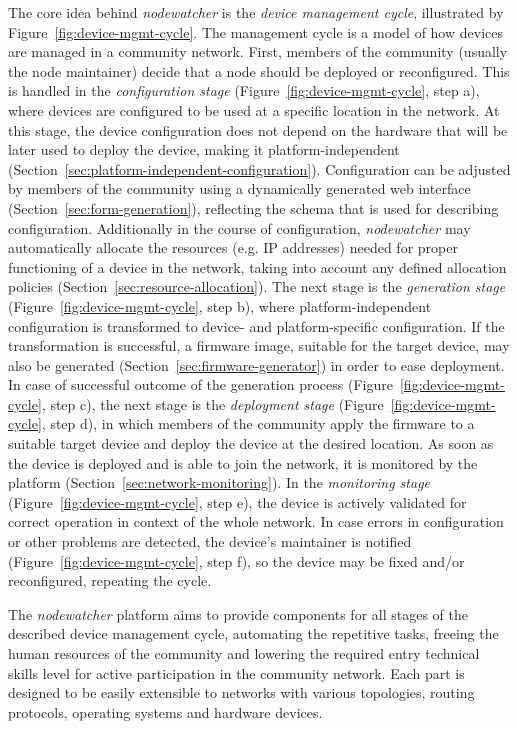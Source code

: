 \documentclass[5p,sort&compress]{elsarticle}
\newcommand{\nodewatcher}{\textit{nodewatcher}}
\begin{document}
The core idea behind \nodewatcher{} is the \textit{device management cycle}, illustrated by Figure~\ref{fig:device-mgmt-cycle}.
The management cycle is a model of how devices are managed in a community network.
First, members of the community (usually the node maintainer) decide that a node should be deployed or reconfigured.
This is handled in the \textit{configuration stage} (Figure~\ref{fig:device-mgmt-cycle}, step a), where devices are configured to be used at a specific location in the network.
At this stage, the device configuration does not depend on the hardware that will be later used to deploy the device, making it platform-independent (Section~\ref{sec:platform-independent-configuration}).
Configuration can be adjusted by members of the community using a dynamically generated web interface (Section~\ref{sec:form-generation}), reflecting the schema that is used for describing configuration.
Additionally in the course of configuration, \nodewatcher{} may automatically allocate the resources (e.g. IP addresses) needed for proper functioning of a device in the network, taking into account any defined allocation policies (Section~\ref{sec:resource-allocation}).
The next stage is the \textit{generation stage} (Figure~\ref{fig:device-mgmt-cycle}, step b), where platform-independent configuration is transformed to device- and platform-specific configuration. 
If the transformation is successful, a firmware image, suitable for the target device, may also be generated (Section~\ref{sec:firmware-generator}) in order to ease deployment.
In case of successful outcome of the generation process (Figure~\ref{fig:device-mgmt-cycle}, step c), the next stage is the \textit{deployment stage} (Figure~\ref{fig:device-mgmt-cycle}, step d), in which members of the community apply the firmware to a suitable target device and deploy the device at the desired location.
As soon as the device is deployed and is able to join the network, it is monitored by the platform (Section~\ref{sec:network-monitoring}).
In the \textit{monitoring stage} (Figure~\ref{fig:device-mgmt-cycle}, step e), the device is actively validated for correct operation in context of the whole network.
In case errors in configuration or other problems are detected, the device's maintainer is notified (Figure~\ref{fig:device-mgmt-cycle}, step f), so the device may be fixed and/or reconfigured, repeating the cycle.

The \nodewatcher{} platform aims to provide components for all stages of the described device management cycle, automating the repetitive tasks, freeing the human resources of the community and lowering the required entry technical skills level for active participation in the community network.  
Each part is designed to be easily extensible to networks with various topologies, routing protocols, operating systems and hardware devices.
\end{document}
